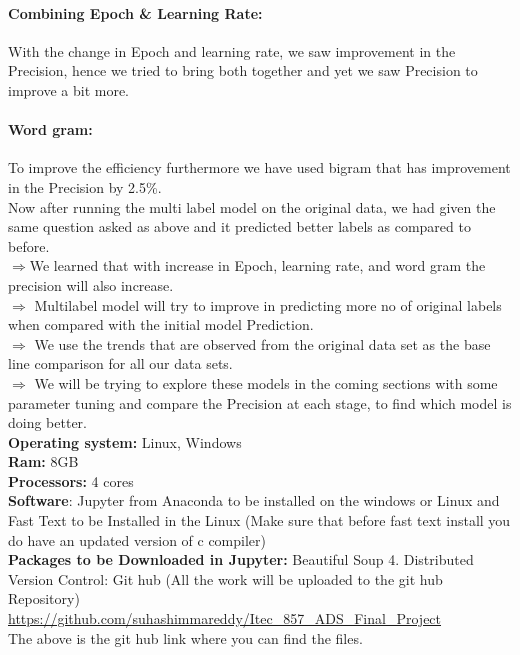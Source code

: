 \documentclass[a4paper,1pt]{article}
\begin{document}
\paragraph{Combining Epoch \& Learning Rate:}{With the change in Epoch and learning rate, we saw improvement in the Precision, hence we tried to bring both together and yet we saw Precision to improve a bit more.}

\paragraph{Word gram:}{To improve the efficiency furthermore we have used bigram that has  improvement in the Precision by 2.5\%.}\\

\noindent Now after running the multi label model on the original data, we had given the same question asked as above and it predicted better labels as compared to before.\\

\noindent$\Rightarrow$We learned that with increase in Epoch, learning rate, and word gram the precision will also increase.\\

\noindent$\Rightarrow$ Multilabel model will try to improve in predicting more no of original labels when compared with the initial model Prediction.\\ 

\noindent$\Rightarrow$	We use the trends that are observed from the original data set as the base line comparison for all our data sets.\\

\noindent$\Rightarrow$	We will be trying to explore these models in the coming sections with some parameter tuning and compare the Precision at each stage, to find which model is doing better.\\


\noindent\textbf{Operating system:}  Linux, Windows\\
\textbf{Ram:} 8GB\\
\textbf{Processors:} 4 cores\\
\textbf{Software}: Jupyter from Anaconda to be installed on the windows or Linux and Fast Text to be Installed in the Linux (Make sure that before fast text install you do have an updated version of c compiler)\\

\noindent\textbf{Packages to be Downloaded in Jupyter:} Beautiful Soup 4.
Distributed Version Control: Git hub (All the work will be uploaded to the git hub Repository)\\
\url{https://github.com/suhashimmareddy/Itec_857_ADS_Final_Project}\\
The above is the git hub link where you can find the files. 
\end{document}
